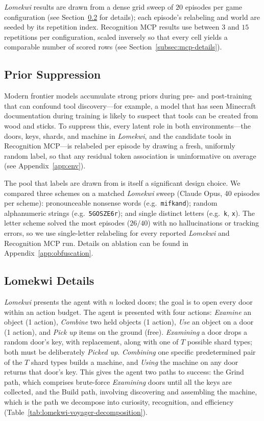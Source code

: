\documentclass{article}
\begin{document}
\emph{Lomekwi} results are drawn from a dense grid sweep of $20$ episodes per game configuration (see Section~\ref{subsec:lom-details} for details); each episode's relabeling and world are seeded by its repetition index. Recognition MCP results use between $3$ and $15$ repetitions per configuration, scaled inversely so that every cell yields a comparable number of scored rows (see Section~\ref{subsec:mcp-details}).

\subsection{Prior Suppression}
\label{subsec:prior-suppression}

Modern frontier models accumulate strong priors during pre- and post-training that can confound tool discovery---for example, a model that has seen Minecraft documentation during training is likely to suspect that tools can be created from wood and sticks. To suppress this, every latent role in both environments---the doors, keys, shards, and machine in \emph{Lomekwi}, and the candidate tools in Recognition MCP---is relabeled per episode by drawing a fresh, uniformly random label, so that any residual token association is uninformative on average (see Appendix~\ref{app:env}).

The pool that labels are drawn from is itself a significant design choice. We compared three schemes on a matched \emph{Lomekwi} sweep (Claude Opus, 40 episodes per scheme): pronounceable nonsense words (e.g.\ \texttt{mifkand}); random alphanumeric strings (e.g.\ \texttt{5GOSZE6r}); and single distinct letters (e.g.\ \texttt{k}, \texttt{x}). The letter scheme solved the most episodes ($26/40$) with no hallucinations or tracking errors, so we use single-letter relabeling for every reported \emph{Lomekwi} and Recognition MCP run. Details on ablation can be found in Appendix~\ref{app:obfuscation}.

\subsection{Lomekwi Details}
\label{subsec:lom-details}

\emph{Lomekwi} presents the agent with $n$ locked doors; the goal is to open every door within an action budget. The agent is presented with four actions: \emph{Examine} an object (1 action), \emph{Combine} two held objects (1 action), \emph{Use} an object on a door (1 action), and \emph{Pick up} items on the ground (free). \emph{Examining} a door drops a random door's key, with replacement, along with one of $T$ possible shard types; both must be deliberately \emph{Picked up}. \emph{Combining} one specific predetermined pair of the $T$ shard types builds a machine, and \emph{Using} the machine on any door returns that door's key. This gives the agent two paths to success: the Grind path, which comprises brute-force \emph{Examining} doors until all the keys are collected, and the Build path, involving discovering and assembling the machine, which is the path we decompose into curiosity, recognition, and efficiency (Table~\ref{tab:lomekwi-voyager-decomposition}).
\end{document}
